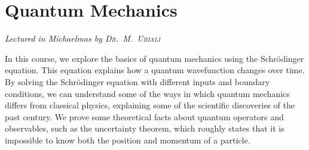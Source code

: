 \chapter[Quantum Mechanics \\ \textnormal{\emph{Lectured in Michaelmas \oldstylenums{2021} by \textsc{Dr.\ M.\ Ubiali}}}]{Quantum Mechanics}
\emph{\Large Lectured in Michaelmas  by \textsc{Dr.\ M.\ Ubiali}}

In this course, we explore the basics of quantum mechanics using the Schr\"odinger equation.
This equation explains how a quantum wavefunction changes over time.
By solving the Schr\"odinger equation with different inputs and boundary conditions, we can understand some of the ways in which quantum mechanics differs from classical physics, explaining some of the scientific discoveries of the past century.
We prove some theoretical facts about quantum operators and observables, such as the uncertainty theorem, which roughly states that it is impossible to know both the position and momentum of a particle.


